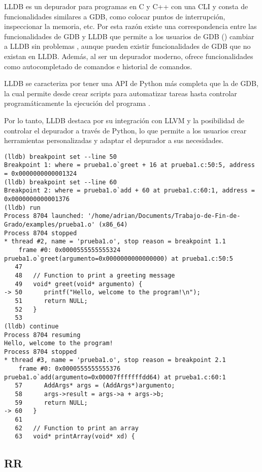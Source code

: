 LLDB es un \gls{depurador} para programas en C y C++ con una \gls{CLI} y consta de funcionalidades similares a GDB, como colocar puntos de interrupción, inspeccionar la memoria, etc. Por esta razón existe una correspondencia entre las funcionalidades de GDB y LLDB que permite a los usuarios de GDB () cambiar a LLDB sin problemas \cite{LLDB}, aunque pueden existir funcionalidades de GDB que no existan en LLDB. Además, al ser un \gls{depurador} moderno, ofrece funcionalidades como autocompletado de comandos e historial de comandos.

LLDB se caracteriza por tener una \gls{API} de Python más completa que la de GDB, la cual permite desde crear \glspl{script} para automatizar tareas hasta controlar programáticamente la ejecución del programa \cite{LLDBPython}. 

Por lo tanto, LLDB destaca por su integración con LLVM y la posibilidad de controlar el \gls{depurador} a través de Python, lo que permite a los usuarios crear herramientas personalizadas y adaptar el \gls{depurador} a sus necesidades.

\begin{lstlisting}[caption={Muestra del depurador LLDB}]
    (lldb) breakpoint set --line 50
Breakpoint 1: where = prueba1.o`greet + 16 at prueba1.c:50:5, address = 0x0000000000001324
(lldb) breakpoint set --line 60
Breakpoint 2: where = prueba1.o`add + 60 at prueba1.c:60:1, address = 0x0000000000001376
(lldb) run
Process 8704 launched: '/home/adrian/Documents/Trabajo-de-Fin-de-Grado/examples/prueba1.o' (x86_64)
Process 8704 stopped
* thread #2, name = 'prueba1.o', stop reason = breakpoint 1.1
    frame #0: 0x0000555555555324 prueba1.o`greet(argumento=0x0000000000000000) at prueba1.c:50:5
   47  	
   48  	// Function to print a greeting message
   49  	void* greet(void* argumento) {
-> 50  	   printf("Hello, welcome to the program!\n");
   51  	   return NULL;
   52  	}
   53  	
(lldb) continue
Process 8704 resuming
Hello, welcome to the program!
Process 8704 stopped
* thread #3, name = 'prueba1.o', stop reason = breakpoint 2.1
    frame #0: 0x0000555555555376 prueba1.o`add(argumento=0x00007fffffffdd64) at prueba1.c:60:1
   57  	   AddArgs* args = (AddArgs*)argumento;
   58  	   args->result = args->a + args->b;
   59  	   return NULL;
-> 60  	}
   61  	
   62  	// Function to print an array
   63  	void* printArray(void* xd) {

\end{lstlisting}

\subsection{RR}{\label{subsec:rr}}


